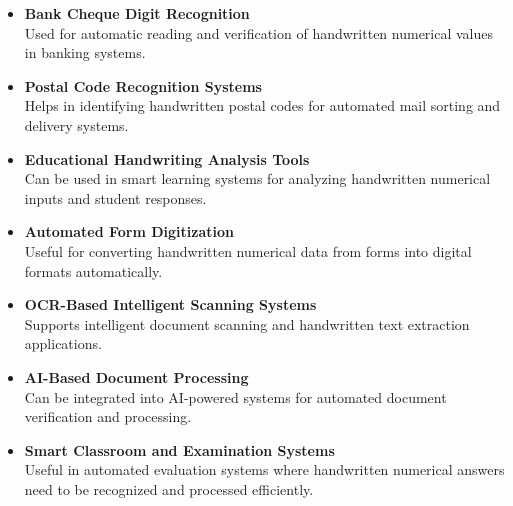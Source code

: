 \documentclass[12pt,a4paper]{article}
\begin{document}
\begin{itemize}

\item \textbf{Bank Cheque Digit Recognition} \\
Used for automatic reading and verification of handwritten numerical values in banking systems.

\vspace{0.2cm}

\item \textbf{Postal Code Recognition Systems} \\
Helps in identifying handwritten postal codes for automated mail sorting and delivery systems.

\vspace{0.2cm}

\item \textbf{Educational Handwriting Analysis Tools} \\
Can be used in smart learning systems for analyzing handwritten numerical inputs and student responses.

\vspace{0.2cm}

\item \textbf{Automated Form Digitization} \\
Useful for converting handwritten numerical data from forms into digital formats automatically.

\vspace{0.2cm}

\item \textbf{OCR-Based Intelligent Scanning Systems} \\
Supports intelligent document scanning and handwritten text extraction applications.

\vspace{0.2cm}

\item \textbf{AI-Based Document Processing} \\
Can be integrated into AI-powered systems for automated document verification and processing.

\vspace{0.2cm}

\item \textbf{Smart Classroom and Examination Systems} \\
Useful in automated evaluation systems where handwritten numerical answers need to be recognized and processed efficiently.

\end{itemize}
\end{document}
